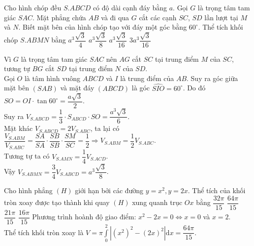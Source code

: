 \begin{ex}%
Cho hình chóp đều $S.ABCD$ có độ dài cạnh đáy bằng $a$. Gọi $G$ là trọng tâm tam giác $SAC$. Mặt phẳng chứa $AB$ và đi qua $G$ cắt các cạnh $SC$, $SD$ lần lượt tại $M$ và $N$. Biết mặt bên của hình chóp tạo với đáy một góc bằng $60^\circ$. Thể tích khối chóp $S.ABMN$ bằng
\choice
{$a^3\dfrac{\sqrt{3}}{4}$}
{\True $a^3\dfrac{\sqrt{3}}{8}$}
{$a^3\dfrac{\sqrt{3}}{16}$}
{$3a^3\dfrac{\sqrt{3}}{16}$}
\loigiai
{\begin{center}
\end{center}
Vì $G$ là trọng tâm tam giác $SAC$ nên $AG$ cắt $SC$ tại trung điểm $M$ của $SC$, tương tự $BG$ cắt $SD$ tại trung điểm $N$ của $SD$.\\Gọi $O$ là tâm hình vuông $ABCD$ và $I$ là trung điểm của $AB$. Suy ra góc giữa mặt bên $(SAB)$ và mặt đáy $(ABCD)$ là góc $\widehat{SIO}=60^\circ$. Do đó $SO=OI\cdot\tan 60^\circ=\dfrac{a\sqrt{3}}{2}$.\\Suy ra $V_{S.ABCD}=\dfrac{1}{3}\cdot S_{ABCD}\cdot SO=\dfrac{a^3\sqrt{3}}{6}$.\\Mặt khác $V_{S.ABCD}=2V_{S.ABC}$, ta lại có $\dfrac{V_{S.ABM}}{V_{S.ABC}}=\dfrac{SA}{SA}\cdot\dfrac{SB}{SB}\cdot\dfrac{SM}{SC}=\dfrac{1}{2}\Rightarrow V_{S.ABM}=\dfrac{1}{2}V_{S.ABC}$.\\Tương tự ta có $V_{S.AMN}=\dfrac{1}{4}V_{S.ACD}$.\\Vậy $V_{S.ABMN}=\dfrac{3}{4}V_{S.ABCD}=a^3\dfrac{\sqrt{3}}{8}$.
}
\end{ex}

\begin{ex}%
Cho hình phẳng $(H)$ giới hạn bởi các đường $y=x^2, y=2x$. Thể tích của khối tròn xoay được tạo thành khi quay $(H)$ xung quanh trục $Ox$ bằng
\choice
{$\dfrac{32\pi}{15}$}
{\True $\dfrac{64\pi}{15}$}
{$\dfrac{21\pi}{15}$}
{$\dfrac{16\pi}{15}$}
\loigiai
{Phương trình hoành độ giao điểm: $x^2-2x=0\Leftrightarrow x=0$ và $x=2$.\\Thể tích khối tròn xoay là $V=\pi\displaystyle\int\limits_0^2\left|\left(x^2\right)^2-\left(2x\right)^2\right|\mathrm{d}x=\dfrac{64\pi}{15}$.}
\end{ex}

